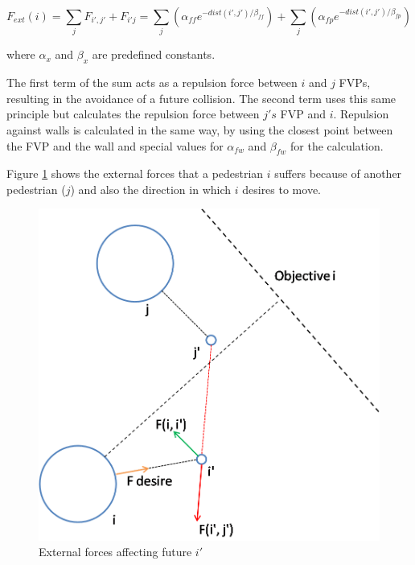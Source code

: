 \documentclass[english]{article}
\numberwithin{equation}{section}
\numberwithin{figure}{section}
\begin{document}
\begin{itemize}
\begin{itemize}
\[
F_{ext}(i)=\sum_{j}F_{i',j'}+F_{i'j}=\sum_{j}(\alpha_{ff}e^{-dist(i',j')/\beta_{ff}})+\sum_{j}(\alpha_{fp}e^{-dist(i',j')/\beta_{fp}})
\]

where $\alpha_{x}$ and $\beta_{x}$ are predefined constants. 

The first term of the sum acts as a repulsion force between $i$ and $j$
FVPs, resulting in the avoidance of a future collision.
The second term uses this same principle but calculates the repulsion
force between $j's$ FVP and $i$.
Repulsion against walls is calculated in the same way, by using the
closest point between the FVP and the wall and special values for
$\alpha_{fw}$ and $\beta_{fw}$ for the calculation.

Figure \ref{fig:External-forces-affecting} shows the external forces
that a pedestrian $i$ suffers because of another pedestrian ($j$)
and also the direction in which $i$ desires to move.


\begin{figure}[H]
\centering{}\includegraphics[scale=0.5]{pics/pedestrian-top-forces}\protect\caption{\label{fig:External-forces-affecting}External forces affecting future
$i'$}
\end{figure}


\end{itemize}
\end{itemize}
\end{document}
